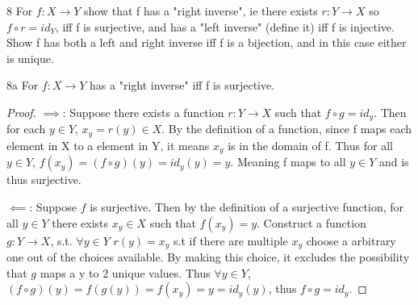 \documentclass{article}
\newcommand{\rarr}[0]{\rightarrow}
\begin{document}
\begin{QU}{8}\label{Question 8.}
	For $f: X \rarr Y$ show that f has a "right inverse", ie there exists $r: Y \rarr X$ so $f \circ r = id_Y$, iff  f is surjective, and has a "left inverse" (define it) iff f is injective.  Show f has both a left and right inverse iff f is a bijection, and in this case either is unique.
\end{QU}
\begin{claim}{8a}
	For $f: X \rarr Y$ has a "right inverse" iff  f is surjective.
\end{claim}
\begin{proof}
	$\implies$: Suppose there exists a function $r : Y \rarr X$ such that $f \circ g = id_y$. Then for each $y \in Y$, $x_y = r(y) \in X$. By the definition of a function, since f maps each element in X to a element in Y, it means $x_y$ is in the domain of f. Thus for all $y \in Y$, $f(x_y) = (f \circ g)(y) = id_y(y) = y$. Meaning f maps to all $y \in Y$ and is thus surjective.

	$\impliedby$: Suppose $f$ is surjective. Then by the definition of a surjective function, for all $y \in Y$ there exists $x_y \in X$ such that $f(x_y) = y$. Construct a function $g : Y \rarr X$, s.t. $\forall y \in Y$ $r(y) = x_y$ s.t if there are multiple $x_y$ choose a arbitrary one out of the choices available. By making this choice, it excludes the possibility that $g$ maps a y to 2 unique values. Thus $\forall y \in Y$, $(f \circ g)(y) = f(g(y)) = f(x_y) = y = id_y(y)$, thus $f \circ g = id_y$.
\end{proof}
\end{document}

